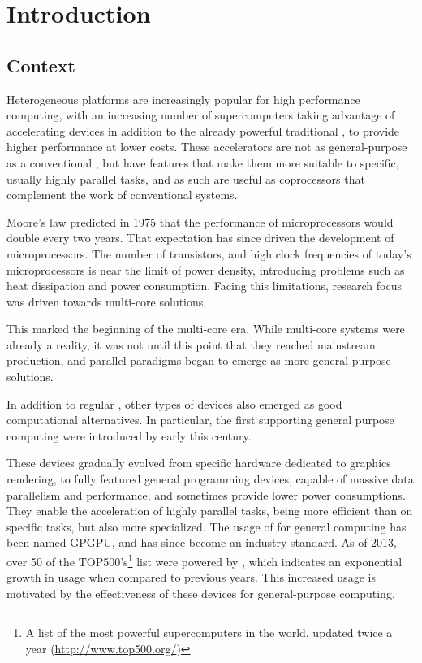 \documentclass[main.tex]{subfiles}
\begin{document}
\chapter{Introduction}

\section{Context}

Heterogeneous platforms are increasingly popular for high performance computing, with an increasing number of supercomputers taking advantage of accelerating devices in addition to the already powerful traditional \cpus, to provide higher performance at lower costs. These accelerators are not as general-purpose as a conventional \cpu, but have features that make them more suitable to specific, usually highly parallel tasks, and as such are useful as coprocessors that complement the work of conventional systems.

Moore's law \cite{moore1965cramming,moore1975progress} predicted in 1975 that the performance of microprocessors would double every two years. That expectation has since driven the development of microprocessors. The number of transistors, and high clock frequencies of today's microprocessors is near the limit of power density, introducing problems such as heat dissipation and power consumption. Facing this limitations, research focus was driven towards multi-core solutions.

This marked the beginning of the multi-core era. While multi-core systems were already a reality, it was not until this point that they reached mainstream production, and parallel paradigms began to emerge as more general-purpose solutions.

In addition to regular \cpus, other types of devices also emerged as good computational alternatives. In particular, the first \gpus supporting general purpose computing were introduced by \nvidia early this century.

These devices gradually evolved from specific hardware dedicated to graphics rendering, to fully featured general programming devices, capable of massive data parallelism and performance, and sometimes provide lower power consumptions.
They enable the acceleration of highly parallel tasks, being more efficient than \cpus on specific tasks, but also more specialized. The usage of \gpus for general computing has been named \ac{GPGPU}, and has since become an industry standard.
As of 2013, over 50 of the TOP500's\footnote{A list of the most powerful supercomputers in the world, updated twice a year (\url{http://www.top500.org/})} list were powered by \gpus, which indicates an exponential growth in usage when compared to previous years. This increased usage is motivated by the effectiveness of these devices for general-purpose computing.
\end{document}
